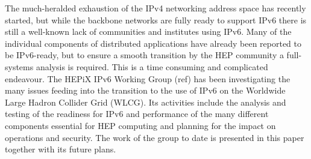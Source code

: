 The much-heralded exhaustion of the IPv4 networking address space has recently started,
but while the backbone networks are fully ready to support IPv6 there is still a well-known lack of communities and institutes using IPv6.
Many of the individual components of distributed applications have already been reported to be IPv6-ready,
but to ensure a smooth transition by the HEP community a full-systems analysis 
is required. This is a time consuming and complicated endeavour.
The HEPiX IPv6 Working Group (ref) has been investigating the many issues feeding into the 
transition to the use of IPv6 on the Worldwide Large Hadron Collider Grid (WLCG). 
Its activities include the analysis and testing of the readiness for IPv6 and 
performance of the many different components essential for HEP computing and planning for the impact on operations and security. The work of the group to date is presented in this paper together with its future plans.
